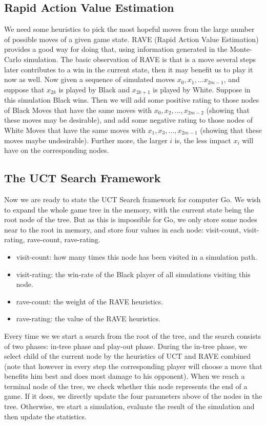 \subsection{Rapid Action Value Estimation}
We need some heuristics to pick the most hopeful moves from the large number of possible moves of a given game state. RAVE (Rapid Action Value Estimation) \cite{gelly2011monte} provides a good way for doing that, using information generated in the Monte-Carlo simulation. The basic observation of RAVE is that is a move several steps later contributes to a win in the current state, then it may benefit us to play it now as well. Now given a sequence of simulated moves $x_0, x_1, \dots x_{2m-1}$, and suppose that $x_{2k}$ is played by Black and $x_{2k+1}$ is played by White. Suppose in this simulation Black wins. Then we will add some positive rating to those nodes of Black Moves that have the same moves with $x_0, x_2, \dots, x_{2m-2}$ (showing that these moves may be desirable), and add some negative rating to those nodes of White Moves that have the same moves with $x_1, x_3, \dots, x_{2m-1}$ (showing that these moves maybe undesirable). Further more, the larger $i$ is, the less impact $x_i$ will have on the corresponding nodes.


\subsection{The UCT Search Framework}
Now we are ready to state the UCT Search framework for computer Go. We wish to expand the whole game tree in the memory, with the current state being the root node of the tree. But as this is impossible for Go, we only store some nodes near to the root in memory, and store four values in each node: visit-count, visit-rating, rave-count, rave-rating.
\begin{itemize}
  \item visit-count: how many times this node has been visited in a simulation path.
  \item visit-rating: the win-rate of the Black player of all simulations visiting this node.
  \item rave-count: the weight of the RAVE heuristics.
  \item rave-rating: the value of the RAVE heuristics.
\end{itemize}

Every time we we start a search from the root of the tree, and the search consists of two phases: in-tree phase and play-out phase. During the in-tree phase, we select child of the current node by the heuristics of UCT and RAVE combined (note that however in every step the corresponding player will choose a move that benefits him best and does most damage to his opponent). When we reach a terminal node of the tree, we check whether this node represents the end of a game. If it does, we directly update the four parameters above of the nodes in the tree. Otherwise, we start a simulation, evaluate the result of the simulation and then update the statistics.

